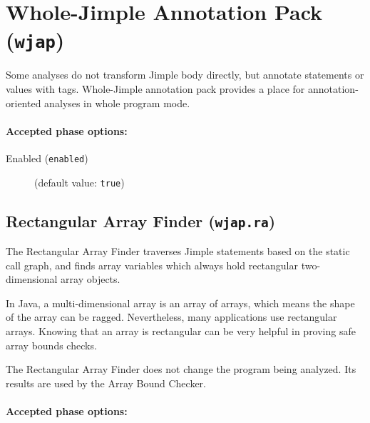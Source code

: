 \documentclass{article}
\begin{document}
\section{Whole-Jimple Annotation Pack ({\tt wjap})}


\par

Some analyses do not transform Jimple body directly, but annotate
statements or values with tags. Whole-Jimple annotation pack provides
a place for annotation-oriented analyses in whole program mode.


\paragraph{Accepted phase options:} 

\begin{description}

\item[Enabled ({\tt enabled})]
(default value: {\tt true})






\end{description}

\subsection{Rectangular Array Finder ({\tt wjap.ra})}
 

\par

The Rectangular Array Finder traverses Jimple statements
based on the static call graph, and finds array variables which always
hold rectangular two-dimensional array objects.

\par

In Java, a multi-dimensional array is an array of arrays, which
means the shape of the array can be ragged. Nevertheless, many
applications use rectangular arrays. Knowing that an array is
rectangular can be very helpful in proving safe array bounds
checks.

\par

The Rectangular Array Finder does not change the
program being analyzed. Its results are used by the Array Bound
Checker.


\paragraph{Accepted phase options:} 
\end{document}
